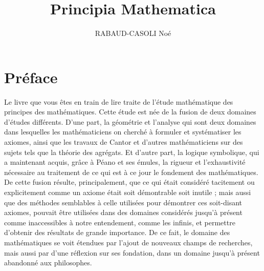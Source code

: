 \documentclass[a4paper]{book}
\title{Principia Mathematica}
\author{RABAUD-CASOLI Noé}
\begin{document}
\maketitle
\tableofcontents

\frontmatter

\chapter{Préface}
 
Le livre que vous êtes en train de lire traite de l'étude mathématique des principes des mathématiques. Cette étude est née de la fusion de deux domaines d'études différents. D'une part, la géométrie et l'analyse qui sont deux domaines dans lesquelles les mathématiciens on cherché à formuler et systématiser les axiomes, ainsi que les travaux de Cantor et d'autres mathématiciens sur des sujets tels que la théorie des agrégats. Et d'autre part, la logique symbolique, qui a maintenant acquis, grâce à Péano et ses émules, la rigueur et l'exhaustivité nécessaire au traitement de ce qui est à ce jour le fondement des mathématiques. De cette fusion résulte, principalement, que ce qui était considéré tacitement ou explicitement comme un axiome était soit démontrable soit inutile ; mais aussi que des méthodes semblables à celle utilisées pour démontrer ces soit-disant axiomes, pouvait être utilisées dans des domaines considérés jusqu'à présent comme inaccessibles à notre entendement, comme les infinis, et permettre d'obtenir des résultats de grande importance. De ce fait, le domaine des mathématiques se voit étendues par l'ajout de nouveaux champs de recherches, mais aussi par d'une réflexion sur ses fondation, dans un domaine jusqu'à présent abandonné aux philosophes. 
 
\end{document}

